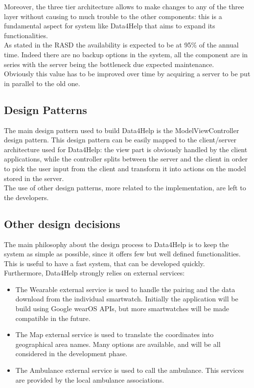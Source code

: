 Moreover, the three tier architecture allows to make changes to any of the three layer without causing to much trouble to the other components: this is a fundamental aspect for system like Data4Help that aims to expand its functionalities.
\\

As stated in the RASD the availability is expected to be at 95\% of the annual time. Indeed there are no backup options in the system, all the component are in series with the server being the bottleneck due expected maintenance.\\
Obviously this value has to be improved over time by acquiring a server to be put in parallel to the old one.


\subsection{Design Patterns}
The main design pattern used to build Data4Help is the ModelViewController design pattern.
This design pattern can be easily mapped to the client/server architecture used for Data4Help: the 
view part is obviously handled by the client applications, while the controller splits between the server and the client in order to pick the user input from the client and transform it into actions on the model stored in the server.
\\
The use of other design patterns, more related to the implementation, are left to the developers. 

\subsection{Other design decisions}
The main philosophy about the design process to Data4Help is to keep the system as simple as possible, since it offers few but well defined functionalities. This is useful to have a fast system, that can be developed quickly.\\
Furthermore, Data4Help strongly relies on external services:
\begin{itemize}
\item The Wearable external service is used to handle the pairing and the data download from the individual smartwatch. Initially the application will be build using Google wearOS APIs, but more smartwatches will be made compatible in the future.
\item The Map external service is used to translate the coordinates into geographical area names. Many options are available, and will be all considered in the development phase.
\item The Ambulance external service is used to call the ambulance. This services are provided by the local ambulance associations.
\end{itemize}


